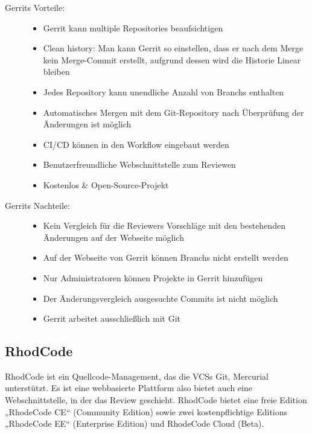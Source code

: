 \begin{description}
	\item [Gerrits Vorteile:] \hfill
	\begin{itemize}
		\item Gerrit kann multiple Repositories beaufsichtigen
		\item Clean history: Man kann Gerrit so einstellen, dass er nach dem Merge kein Merge-Commit erstellt, aufgrund dessen wird die Historie Linear bleiben
		\item Jedes Repository kann unendliche Anzahl von Branchs enthalten
		\item Automatisches Mergen mit dem Git-Repository nach Überprüfung der Änderungen ist möglich
		\item \ac{CI}/\ac{CD} können in den Workflow eingebaut werden
		\item Benutzerfreundliche Webschnittstelle zum Reviewen
		\item Kostenlos \& Open-Source-Projekt
	\end{itemize}
	
	\item [Gerrits Nachteile:] \hfill
	\begin{itemize}
		\item Kein Vergleich für die Reviewers Vorschläge mit den bestehenden Änderungen auf der Webseite möglich
		\item Auf der Webseite von Gerrit können Branchs nicht erstellt werden
		\item Nur Administratoren können Projekte in Gerrit hinzufügen
		\item Der Änderungsvergleich ausgesuchte Commits ist nicht möglich
		\item Gerrit arbeitet ausschließlich mit Git
	\end{itemize}
\end{description}

\subsection{RhodCode}
\label{subsec:RhodeCode}

RhodCode ist ein Quellcode-Management, das die \acp{VCS} Git, Mercurial unterstützt. Es ist eine webbasierte Plattform also bietet auch eine Webschnittstelle, in der das Review geschieht.
RhodCode bietet eine freie Edition „RhodeCode CE“ (Community Edition) sowie zwei kostenpflichtige Editions „RhodeCode EE“ (Enterprise Edition) und RhodeCode Cloud (Beta).

